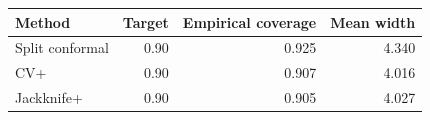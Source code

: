 \begin{tabular}{lrrr}
\toprule
Method & Target & Empirical coverage & Mean width \\
\midrule
Split conformal & 0.90 & 0.925 & 4.340 \\
CV+ & 0.90 & 0.907 & 4.016 \\
Jackknife+ & 0.90 & 0.905 & 4.027 \\
\bottomrule
\end{tabular}
